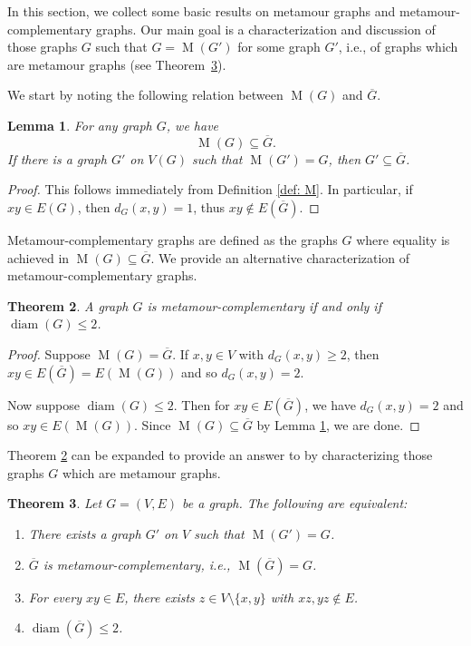 \documentclass[12pt]{amsart}
\newtheorem{theorem}{Theorem}[section]
\newtheorem{lemma}[theorem]{Lemma}
\theoremstyle{definition}
\theoremstyle{remark}
\numberwithin{equation}{section}
\numberwithin{figure}{section}
\newcommand{\M}{\operatorname{M}}
\newcommand{\diam}{\operatorname{diam}}
\begin{document}
In this section, we collect some basic results on metamour graphs and metamour-complementary graphs. Our main goal is a characterization and discussion of those graphs $G$ such that $G=\M(G')$ for some graph $G'$, i.e., of graphs which are metamour graphs (see Theorem~\ref{thm: inverse image of M}).

We start by noting the following relation between $\M(G)$ and $\overline{G}$.

\begin{lemma} \label{lem: subset of G bar}
    For any graph $G$, we have
    \[ \M(G)\subseteq \overline{G}.\]
    If there is a graph $G'$ on $V(G)$ such that $\M(G')=G$, then $G'\subseteq \overline{G}$.
\end{lemma}

\begin{proof}
    This follows immediately from Definition \ref{def: M}. In particular, if $xy \in E(G)$, then $d_G(x,y) = 1$, thus $xy \notin E(\overline{G})$.
\end{proof}

Metamour-complementary graphs are defined as the graphs $G$ where equality is achieved in $\M(G)\subseteq \overline{G}$. We provide an alternative characterization of metamour-complementary graphs.

\begin{theorem}
    A graph $G$ is metamour-complementary if and only if $\diam(G) \leq 2$.
    \label{M(G) = G^c}
\end{theorem}

\begin{proof}
    Suppose $\M(G) = \overline{G}$. If $x,y \in V$ with $d_G(x,y) \geq 2$, then $xy \in E(\overline{G}) = E(\M(G))$ and so $d_G(x,y) = 2$.

    Now suppose $\diam(G) \leq 2$. Then for $xy \in E(\overline{G})$, we have $d_G(x,y) = 2$ and so $xy \in E(\M(G))$. Since $\M(G) \subseteq \overline{G}$ by Lemma \ref{lem: subset of G bar}, we are done.
\end{proof}

Theorem \ref{M(G) = G^c} can be expanded to provide an answer to \cite[Question~10.5]{GaarKrenn2023} by characterizing those graphs $G$ which are metamour graphs.

\begin{theorem} \label{thm: inverse image of M}
    Let $G=(V,E)$ be a graph. The following are equivalent:
    \begin{enumerate}
        \item There exists a graph $G'$ on $V$ such that $\M(G')=G$.
        \item $\overline{G}$ is metamour-complementary, i.e., $\M(\overline{G})=G$.
        \item For every $xy \in E$, there exists $z \in V\setminus \{x,y\}$ with $xz,yz \notin E$.
        \item $\diam(\overline{G}) \leq 2$.
    \end{enumerate}
\end{theorem}
\end{document}
